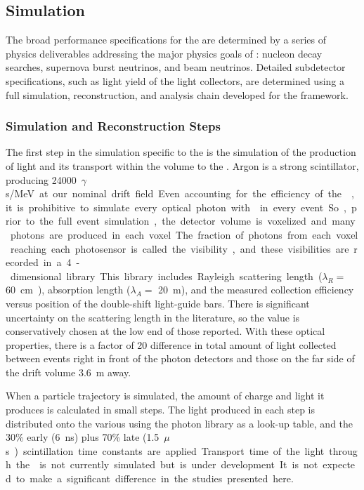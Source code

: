 %
\subsection{Simulation}
\label{sec:fdsp-pd-simphys}


The broad performance specifications for the  are determined by a series of physics deliverables addressing the major physics goals of : nucleon decay searches, supernova burst neutrinos, and beam neutrinos. Detailed subdetector specifications, such as light yield of the light collectors, are determined using a full simulation, reconstruction, and analysis chain developed for the  framework. 

\subsubsection{Simulation and Reconstruction Steps} 
\label{subsec:fdsp-pd-simphys-sim}

The first step in the simulation specific to the  is the simulation of the production of light and its transport within the volume to the . Argon is a strong scintillator, producing \SI{24000}{$\gamma$s/MeV} at our nominal drift field. Even accounting for the efficiency of the , it is prohibitive to simulate every optical photon with  in every event. So, prior to the full event simulation, the detector volume is voxelized and many photons are produced in each voxel. The fraction of photons from each voxel reaching each photosensor is called the visibility, and these visibilities are recorded in a 4-dimensional library.
This library includes Rayleigh scattering length ($\lambda_R=$ \SI{60}{cm}~\cite{Grace:2015yta}), absorption length ($\lambda_A=$ \SI{20}{m}), and the measured collection efficiency versus position of the double-shift light-guide bars. There is significant uncertainty on the scattering length in the literature, so the value is conservatively chosen at the low end of those reported. With these optical properties, there is a factor of 20 difference in total amount of light collected between events right in front of the photon detectors and those on the far side of the drift volume \SI{3.6}{m} away. 

When a particle trajectory is simulated, the amount of charge and light it produces is calculated in small steps. The light produced in each step is 
distributed onto the various  using the photon library as a look-up table, and the 30\% early (\SI{6}{ns}) plus 70\% late (\SI{1.5}{$\mu$s}) scintillation time constants are applied. Transport time of the light through the \lar is not currently simulated but is under development. It is not expected to make a significant difference in the studies presented here.


